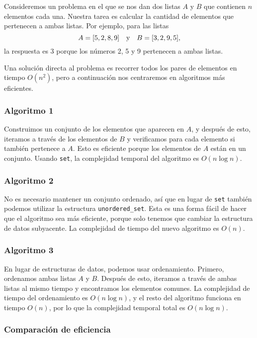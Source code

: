 Consideremos un problema en el que
se nos dan dos listas $A$ y $B$
que contienen $n$ elementos cada una.
Nuestra tarea es calcular la cantidad de elementos
que pertenecen a ambas listas.
Por ejemplo, para las listas
\[A = [5,2,8,9] \hspace{10px} \textrm{y} \hspace{10px} B = [3,2,9,5],\]
la respuesta es 3 porque los números 2, 5
y 9 pertenecen a ambas listas.

Una solución directa al problema es
recorrer todos los pares de elementos en tiempo $O(n^2)$,
pero a continuación nos centraremos en
algoritmos más eficientes.

\subsubsection{Algoritmo 1}

Construimos un conjunto de los elementos que aparecen en $A$,
y después de esto, iteramos a través de los elementos
de $B$ y verificamos para cada elemento si también
pertenece a $A$.
Esto es eficiente porque los elementos de $A$
están en un conjunto.
Usando \texttt{set},
la complejidad temporal del algoritmo es $O(n \log n)$.

\subsubsection{Algoritmo 2}

No es necesario mantener un conjunto ordenado,
así que en lugar de \texttt{set}
también podemos utilizar la estructura \texttt{unordered\_set}.
Esta es una forma fácil de hacer que el algoritmo
sea más eficiente, porque solo tenemos que cambiar
la estructura de datos subyacente.
La complejidad de tiempo del nuevo algoritmo es $O(n)$.

\subsubsection{Algoritmo 3}

En lugar de estructuras de datos, podemos usar ordenamiento.
Primero, ordenamos ambas listas $A$ y $B$.
Después de esto, iteramos a través de ambas listas
al mismo tiempo y encontramos los elementos comunes.
La complejidad de tiempo del ordenamiento es $O(n \log n)$,
y el resto del algoritmo funciona en tiempo $O(n)$,
por lo que la complejidad temporal total es $O(n \log n)$.

\subsubsection{Comparación de eficiencia}

